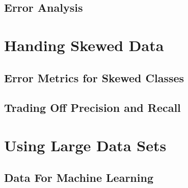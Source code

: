 \documentclass{article}
\begin{document}
\begin{CJK}{UTF8}{gbsn}
\subsection{Error Analysis}
\section{Handing Skewed Data}
\subsection{Error Metrics for Skewed Classes}
\subsection{Trading Off Precision and Recall}
\section{Using Large Data Sets}
\subsection{Data For Machine Learning}
\end{CJK}
\end{document}
